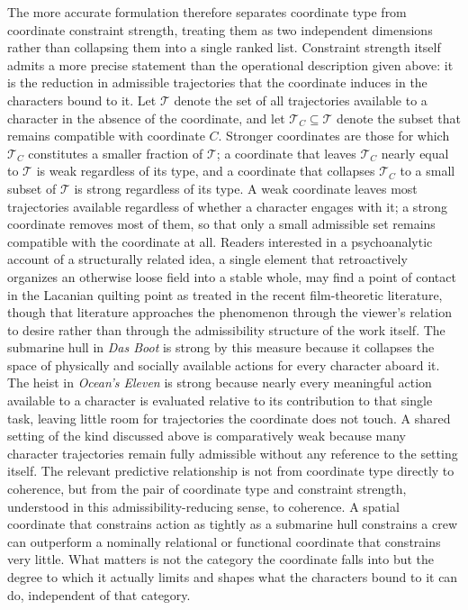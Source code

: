 \documentclass[11pt]{article}
\begin{document}
The more accurate formulation therefore separates coordinate type from coordinate constraint strength, treating them as two independent dimensions rather than collapsing them into a single ranked list. Constraint strength itself admits a more precise statement than the operational description given above: it is the reduction in admissible trajectories that the coordinate induces in the characters bound to it. Let $\mathcal{T}$ denote the set of all trajectories available to a character in the absence of the coordinate, and let $\mathcal{T}_C \subseteq \mathcal{T}$ denote the subset that remains compatible with coordinate $C$. Stronger coordinates are those for which $\mathcal{T}_C$ constitutes a smaller fraction of $\mathcal{T}$; a coordinate that leaves $\mathcal{T}_C$ nearly equal to $\mathcal{T}$ is weak regardless of its type, and a coordinate that collapses $\mathcal{T}_C$ to a small subset of $\mathcal{T}$ is strong regardless of its type. A weak coordinate leaves most trajectories available regardless of whether a character engages with it; a strong coordinate removes most of them, so that only a small admissible set remains compatible with the coordinate at all. Readers interested in a psychoanalytic account of a structurally related idea, a single element that retroactively organizes an otherwise loose field into a stable whole, may find a point of contact in the Lacanian quilting point as treated in the recent film-theoretic literature\cite{rollins2024}, though that literature approaches the phenomenon through the viewer's relation to desire rather than through the admissibility structure of the work itself. The submarine hull in \emph{Das Boot} is strong by this measure because it collapses the space of physically and socially available actions for every character aboard it. The heist in \emph{Ocean's Eleven} is strong because nearly every meaningful action available to a character is evaluated relative to its contribution to that single task, leaving little room for trajectories the coordinate does not touch. A shared setting of the kind discussed above is comparatively weak because many character trajectories remain fully admissible without any reference to the setting itself. The relevant predictive relationship is not from coordinate type directly to coherence, but from the pair of coordinate type and constraint strength, understood in this admissibility-reducing sense, to coherence. A spatial coordinate that constrains action as tightly as a submarine hull constrains a crew can outperform a nominally relational or functional coordinate that constrains very little. What matters is not the category the coordinate falls into but the degree to which it actually limits and shapes what the characters bound to it can do, independent of that category.
\end{document}
